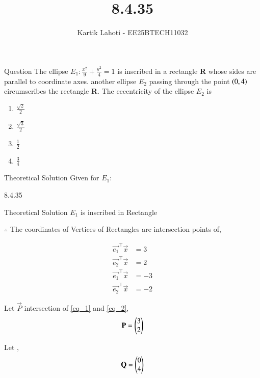 \documentclass{beamer}
\title %
{8.4.35}
\author 
{Kartik Lahoti - EE25BTECH11032}
\begin{document}
\frame{\titlepage}
\begin{frame}{Question}
The ellipse $E_1\colon\frac{x^2}{9}+\frac{y^2}{4} = 1$ is inscribed in a rectangle \textbf{R} whose sides are parallel to coordinate axes. another ellipse $E_2$ passing through the point $\left(0,4\right)$ circumscribes the rectangle \textbf{R}. The eccentricity of the ellipse $E_2$ is 
 \begin{multicols}
    \begin{enumerate}       
        \item $\frac{\sqrt{2}}{2}$
        \item $\frac{\sqrt{3}}{2}$
        \item $\frac{1}{2}$
        \item $\frac{3}{4}$        
    \end{enumerate}
\end{multicols}
\end{frame}

\begin{frame}{Theoretical Solution}
Given for $E_1\colon$

\begin{table}[H]
    \centering
    
    \caption{8.4.35}
    \label{tab:placeholder}
\end{table}

\end{frame}

\begin{frame}{Theoretical Solution}
    $E_1$ is inscribed in Rectangle
    
    $\therefore$ The coordinates of Vertices of Rectangles are intersection points of, 
    
    \begin{align}
        \vec{e_1}^{\top}\vec{x} &= 3 \label{eq_1} \\ 
        \vec{e_2}^{\top}\vec{x} &= 2 \label{eq_2} \\ 
        \vec{e_1}^{\top}\vec{x} &= -3\\
        \vec{e_2}^{\top}\vec{x} &= -2
    \end{align}
    
    Let $\vec{P}$ intersection of \ref{eq_1} and \ref{eq_2}, 
    \begin{align}
        \mathbf{P} = \begin{pmatrix}3\\2\end{pmatrix}
    \end{align}
    
    Let , 
    \begin{align}
        \mathbf{Q} = \begin{pmatrix}0\\4\end{pmatrix}
    \end{align}
\end{frame}
\end{document}
